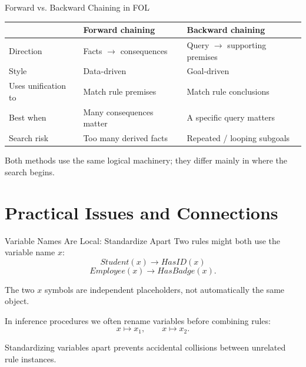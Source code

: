 \documentclass[aspectratio=169,10pt]{beamer}
\begin{document}
\begin{frame}[shrink=10]{Forward vs. Backward Chaining in FOL}
  \begin{center}
    \renewcommand{\arraystretch}{1.35}
    \begin{tabular}{l|p{}|p{}}
      & \textbf{Forward chaining} & \textbf{Backward chaining} \\\hline
      Direction & Facts $\rightarrow$ consequences & Query $\rightarrow$ supporting premises \\
      Style & Data-driven & Goal-driven \\
      Uses unification to & Match rule premises & Match rule conclusions \\
      Best when & Many consequences matter & A specific query matters \\
      Search risk & Too many derived facts & Repeated / looping subgoals \\
    \end{tabular}
  \end{center}

  \begin{keyidea}
    Both methods use the same logical machinery; they differ mainly in where the search begins.
  \end{keyidea}
\end{frame}

\section{Practical Issues and Connections}

\begin{frame}[shrink=10]{Variable Names Are Local: Standardize Apart}
  Two rules might both use the variable name $x$:
  \[
    Student(x) \rightarrow HasID(x)
  \]
  \[
    Employee(x) \rightarrow HasBadge(x).
  \]

  The two $x$ symbols are independent placeholders, not automatically the same object.

  In inference procedures we often rename variables before combining rules:
  \[
    x \mapsto x_1,\qquad x \mapsto x_2.
  \]

  \begin{keyidea}
    Standardizing variables apart prevents accidental collisions between unrelated rule instances.
  \end{keyidea}
\end{frame}
\end{document}

